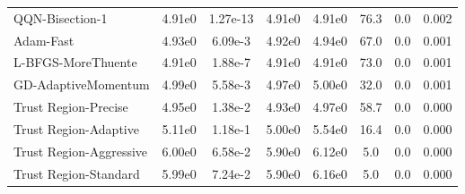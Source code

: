 \documentclass{article}
\begin{document}
\begin{table}[htbp]
{\begin{tabular}{p{2.5cm}*{7}{c}}
QQN-Bisection-1 & 4.91e0 & 1.27e-13 & 4.91e0 & 4.91e0 & 76.3 & 0.0 & 0.002 \\
Adam-Fast & 4.93e0 & 6.09e-3 & 4.92e0 & 4.94e0 & 67.0 & 0.0 & 0.001 \\
L-BFGS-MoreThuente & 4.91e0 & 1.88e-7 & 4.91e0 & 4.91e0 & 73.0 & 0.0 & 0.001 \\
GD-AdaptiveMomentum & 4.99e0 & 5.58e-3 & 4.97e0 & 5.00e0 & 32.0 & 0.0 & 0.001 \\
Trust Region-Precise & 4.95e0 & 1.38e-2 & 4.93e0 & 4.97e0 & 58.7 & 0.0 & 0.000 \\
Trust Region-Adaptive & 5.11e0 & 1.18e-1 & 5.00e0 & 5.54e0 & 16.4 & 0.0 & 0.000 \\
Trust Region-Aggressive & 6.00e0 & 6.58e-2 & 5.90e0 & 6.12e0 & 5.0 & 0.0 & 0.000 \\
Trust Region-Standard & 5.99e0 & 7.24e-2 & 5.90e0 & 6.16e0 & 5.0 & 0.0 & 0.000 \\
\bottomrule
\end{tabular}
}
\end{table}
\end{document}
